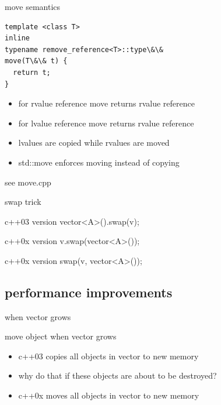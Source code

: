 \documentclass{beamer}
\begin{document}
\begin{frame}{move semantics}
\begin{block}{}
\begin{verbatim}
template <class T>
inline
typename remove_reference<T>::type\&\&
move(T\&\& t) {
  return t;
}

\end{verbatim}
\end{block}
\begin{block}{}
  \begin{itemize}
  \item for rvalue reference move returns rvalue reference
  \item for lvalue reference move returns rvalue reference
  \item lvalues are copied while rvalues are moved
  \item std::move enforces moving instead of copying
  \end{itemize}
\end{block}
  see move.cpp
\end{frame}

\begin{frame}{swap trick}
  \begin{block}{c++03 version}
    vector<A>().swap(v);
  \end{block}

  \begin{block}{c++0x version}
    v.swap(vector<A>());
  \end{block}

  \begin{block}{c++0x version}
    swap(v, vector<A>());
  \end{block}
\end{frame}

\subsection{performance improvements}
\begin{frame}{when vector grows}
  \begin{block}{move object when vector grows}
    \begin{itemize}
    \item c++03 copies all objects in vector to new memory
    \item why do that if these objects are about to be destroyed?
    \item c++0x moves all objects in vector to new memory
    \end{itemize}
  \end{block}
\end{frame}
\end{document}
